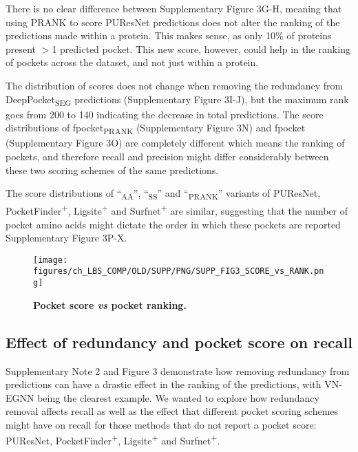 There is no clear difference between Supplementary Figure 3G-H, meaning that using PRANK to score PUResNet predictions does not alter the ranking of the predictions made within a protein. This makes sense, as only 10\% of proteins present $>$1 predicted pocket. This new score, however, could help in the ranking of pockets across the dataset, and not just within a protein.

The distribution of scores does not change when removing the redundancy from DeepPocket\textsubscript{SEG} predictions (Supplementary Figure 3I-J), but the maximum rank goes from 200 to 140 indicating the decrease in total predictions. The score distributions of fpocket\textsubscript{PRANK} (Supplementary Figure 3N) and fpocket (Supplementary Figure 3O) are completely different which means the ranking of pockets, and therefore recall and precision might differ considerably between these two scoring schemes of the same predictions.

The score distributions of ``\textsubscript{AA}'', ``\textsubscript{SS}'' and ``\textsubscript{PRANK}'' variants of PUResNet, PocketFinder\textsuperscript{+}, Ligsite\textsuperscript{+} and Surfnet\textsuperscript{+} are similar, suggesting that the number of pocket amino acids might dictate the order in which these pockets are reported Supplementary Figure 3P-X.

\begin{figure}[ht!]
    \centering
    \texttt{[image: figures/ch\_LBS\_COMP/OLD/SUPP/PNG/SUPP\_FIG3\_SCORE\_vs\_RANK.png]}
    \caption[Pocket score \textit{vs} pocket ranking]{\textbf{Pocket score \textit{vs} pocket ranking.}}
    \label{fig:pocket_score_vs_rank}
\end{figure}

\subsection{Effect of redundancy and pocket score on recall}

Supplementary Note 2 and Figure 3 demonstrate how removing redundancy from predictions can have a drastic effect in the ranking of the predictions, with VN-EGNN being the clearest example. We wanted to explore how redundancy removal affects recall as well as the effect that different pocket scoring schemes might have on recall for those methods that do not report a pocket score: PUResNet, PocketFinder\textsuperscript{+}, Ligsite\textsuperscript{+} and Surfnet\textsuperscript{+}.


